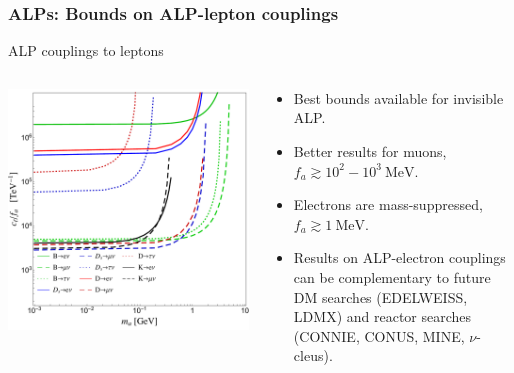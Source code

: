 \documentclass[mathserif, 10pt]{beamer}
\begin{document}
\begin{frame}\frametitle{ALPs: Bounds on ALP-lepton couplings}
    ALP couplings to leptons
    \begin{columns}
        \begin{column}{0.5\textwidth}
            \includegraphics[width=\columnwidth]{figures/Fig3aS}
        \end{column}
        \begin{column}{0.5\textwidth}
            \begin{itemize}
                \item Best bounds available for invisible ALP.
                \item Better results for muons, $f_a \gtrsim 10^2 - 10^3~\mathrm{MeV}$.
                \item Electrons are mass-suppressed, $f_a \gtrsim 1~\mathrm{MeV}$.
                \item Results on ALP-electron couplings can be complementary to future DM searches (EDELWEISS, LDMX) and reactor searches (CONNIE, CONUS, MINE, $\nu$-cleus).
            \end{itemize}
        \end{column}
    \end{columns}
\end{frame}
\end{document}
